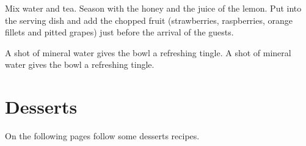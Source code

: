 \documentclass[]{article}
\begin{document}
\preparation
{%
    \init Mix water and tea. Season with the honey and the juice of the lemon.
    \init Put into the serving dish and add the chopped fruit (strawberries, raspberries, orange fillets and pitted grapes) just before the arrival of the guests.
}

\hint
{%
    A shot of mineral water gives the bowl a refreshing tingle. A shot of mineral water gives the bowl a refreshing tingle.
}

\graph       %
[%
    recipename=Fruit bowl,
    recipetime={5 min},
    portion={For 4 person},
    joule={318 cal., 22 g total fat (6 g sat. fat), 76 mg chol., 488 mg sodium, 6 g carb, 2 g dietary fiber, 24g protein.},
    source=CookyBooky example,
    sgraph=,
    sdx=-2,
    sdy=0,
    bgraph=,
    bdx=0,
    bdy=0
]%

\newpage



\section{Desserts}
On the following pages follow some desserts recipes.

\newpage


\end{document}
